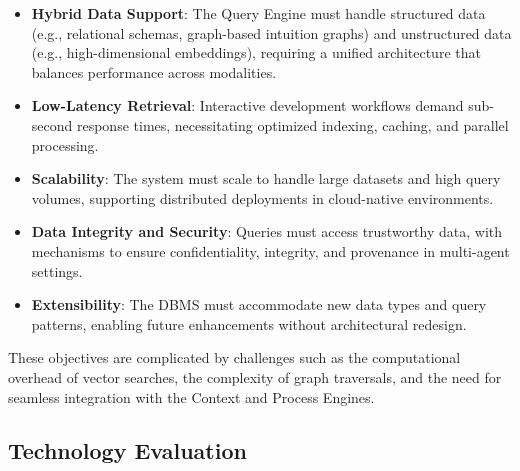 \documentclass[11pt]{article}
\begin{document}
\begin{itemize}
    \item \textbf{Hybrid Data Support}: The Query Engine must handle structured data (e.g., relational schemas, graph-based intuition graphs) and unstructured data (e.g., high-dimensional embeddings), requiring a unified architecture that balances performance across modalities.
    \item \textbf{Low-Latency Retrieval}: Interactive development workflows demand sub-second response times, necessitating optimized indexing, caching, and parallel processing.
    \item \textbf{Scalability}: The system must scale to handle large datasets and high query volumes, supporting distributed deployments in cloud-native environments.
    \item \textbf{Data Integrity and Security}: Queries must access trustworthy data, with mechanisms to ensure confidentiality, integrity, and provenance in multi-agent settings.
    \item \textbf{Extensibility}: The DBMS must accommodate new data types and query patterns, enabling future enhancements without architectural redesign.
\end{itemize}

These objectives are complicated by challenges such as the computational overhead of vector searches, the complexity of graph traversals, and the need for seamless integration with the Context and Process Engines.

\subsection{Technology Evaluation}
\label{subsec:tech_evaluation}
\end{document}
